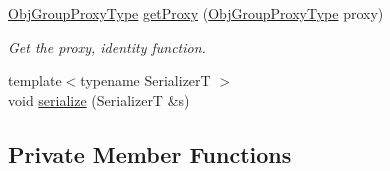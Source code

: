 \begin{DoxyCompactItemize}
\hyperlink{namespacevt_ad7cae989df485fccca57f0792a880a8e}{Obj\+Group\+Proxy\+Type} \hyperlink{structvt_1_1objgroup_1_1_obj_group_manager_a9569c5ad1c032a90573bd987c64f560a}{get\+Proxy} (\hyperlink{namespacevt_ad7cae989df485fccca57f0792a880a8e}{Obj\+Group\+Proxy\+Type} proxy)
\begin{DoxyCompactList}\small\item\em Get the proxy, identity function. \end{DoxyCompactList}\item 
{\footnotesize template$<$typename SerializerT $>$ }\\void \hyperlink{structvt_1_1objgroup_1_1_obj_group_manager_a218394ac115ac9f61d8858b54e06520a}{serialize} (SerializerT \&s)
\end{DoxyCompactItemize}
\subsection*{Private Member Functions}
